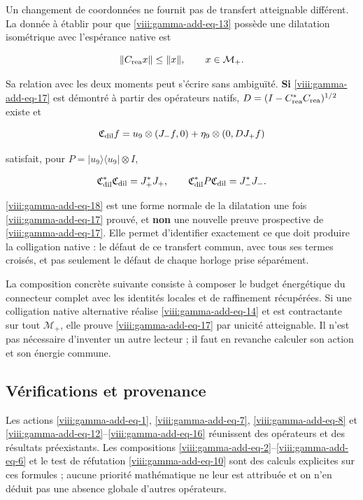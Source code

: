 Un changement de coordonnées ne fournit pas de transfert atteignable différent. La donnée à établir pour que \eqref{viii:gamma-add-eq-13} possède une dilatation isométrique avec l'espérance native est

\begin{equation}
\|C_{\rm rea}x\|\le\|x\|,
\qquad x\in\mathcal M_+.
\label{viii:gamma-add-eq-17}
\end{equation}

Sa relation avec les deux moments peut s'écrire sans ambiguïté. \textbf{Si} \eqref{viii:gamma-add-eq-17} est démontré à partir des opérateurs natifs, \(D=(I-C_{\rm rea}^*C_{\rm rea})^{1/2}\) existe et

\begin{equation}
\mathfrak C_{\rm dil}f
=u_9\otimes(J_-f,0)+\eta_9\otimes(0,DJ_+f)
\label{viii:gamma-add-eq-18}
\end{equation}

satisfait, pour \(P=|u_9\rangle\langle u_9|\otimes I\),

\begin{equation}
\mathfrak C_{\rm dil}^*\mathfrak C_{\rm dil}=J_+^*J_+,\qquad
\mathfrak C_{\rm dil}^*P\mathfrak C_{\rm dil}=J_-^*J_-.
\label{viii:gamma-add-display-37}
\end{equation}

\eqref{viii:gamma-add-eq-18} est une forme normale de la dilatation une fois \eqref{viii:gamma-add-eq-17} prouvé, et \textbf{non} une nouvelle preuve prospective de \eqref{viii:gamma-add-eq-17}. Elle permet d'identifier exactement ce que doit produire la colligation native : le défaut de ce transfert commun, avec tous ses termes croisés, et pas seulement le défaut de chaque horloge prise séparément.

La composition concrète suivante consiste à composer le budget énergétique du connecteur complet avec les identités locales et de raffinement récupérées. Si une colligation native alternative réalise \eqref{viii:gamma-add-eq-14} et est contractante sur tout \(\mathcal M_+\), elle prouve \eqref{viii:gamma-add-eq-17} par unicité atteignable. Il n'est pas nécessaire d'inventer un autre lecteur ; il faut en revanche calculer son action et son énergie commune.

\subsection{Vérifications et provenance}
\label{viii:gamma-add-sub-412}

Les actions \eqref{viii:gamma-add-eq-1}, \eqref{viii:gamma-add-eq-7},
\eqref{viii:gamma-add-eq-8} et \eqref{viii:gamma-add-eq-12}--\eqref{viii:gamma-add-eq-16}
réunissent des opérateurs et des résultats préexistants. Les compositions
\eqref{viii:gamma-add-eq-2}--\eqref{viii:gamma-add-eq-6} et le test de réfutation
\eqref{viii:gamma-add-eq-10} sont des calculs explicites sur ces formules ;
aucune priorité mathématique ne leur est attribuée et on n'en déduit pas une
absence globale d'autres opérateurs.

